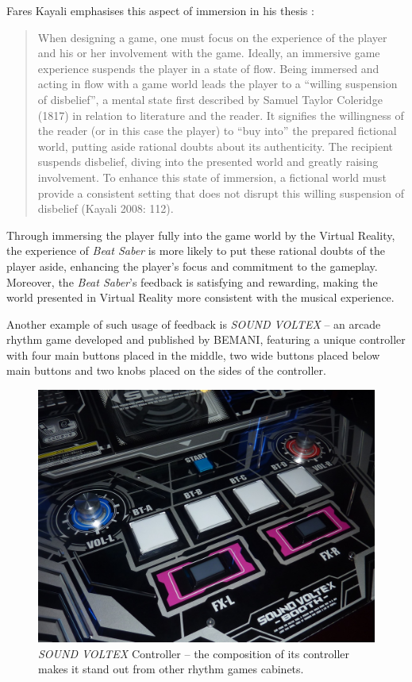 Fares Kayali emphasises this aspect of immersion in his thesis \cite{faresplayingmusic}:

\begin{quote}
    When designing a game, one must focus on the experience of the player and his or her involvement with the game. Ideally, an immersive game experience suspends the player in a state of flow. Being immersed and acting in flow with a game world leads the player to a “willing suspension of disbelief”, a mental state first described by Samuel Taylor Coleridge (1817) in relation to literature and the reader. It signifies the willingness of the reader (or in this case the player) to “buy into” the prepared fictional world, putting aside rational doubts about its authenticity. The recipient suspends disbelief, diving into the presented world and greatly raising involvement. To enhance this state of immersion, a fictional world must provide a consistent setting that does not disrupt this willing suspension of disbelief (Kayali 2008: 112).
\end{quote}

Through immersing the player fully into the game world by the Virtual Reality, the experience of \textit{Beat Saber} is more likely to put these rational doubts of the player aside, enhancing the player’s focus and commitment to the gameplay. Moreover, the \textit{Beat Saber}’s feedback is satisfying and rewarding, making the world presented in Virtual Reality more consistent with the musical experience.

Another example of such usage of feedback is \textit{SOUND VOLTEX} -- an arcade rhythm game developed and published by BEMANI, featuring a unique controller with four main buttons placed in the middle, two wide buttons placed below main buttons and two knobs placed on the sides of the controller.

\begin{figure}[h]
    \centering\includegraphics[scale=0.5]{obrazki/sdvxcontroller.jpeg}
    \caption{\textit{SOUND VOLTEX} Controller -- the composition of its controller makes it stand out from other rhythm games cabinets.\cite{sdvxcontroller}}
    \label{fig:sdvx}
\end{figure}

